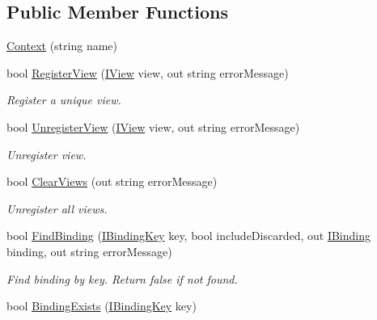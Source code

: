 \subsection*{Public Member Functions}
\begin{DoxyCompactItemize}
\item 
\mbox{\hyperlink{classcp_games_1_1core_1_1_rapid_m_v_c_1_1impl_1_1_context_a5f870e38ed7efdf3fe02ebe0f6052fa2}{Context}} (string name)
\item 
bool \mbox{\hyperlink{classcp_games_1_1core_1_1_rapid_m_v_c_1_1impl_1_1_context_aaca630e99979716757f6b028b8b4aa0c}{Register\+View}} (\mbox{\hyperlink{interfacecp_games_1_1core_1_1_rapid_m_v_c_1_1_i_view}{I\+View}} view, out string error\+Message)
\begin{DoxyCompactList}\small\item\em Register a unique view. \end{DoxyCompactList}\item 
bool \mbox{\hyperlink{classcp_games_1_1core_1_1_rapid_m_v_c_1_1impl_1_1_context_aa1b62f966c4cf9b70e12e4db3bd80903}{Unregister\+View}} (\mbox{\hyperlink{interfacecp_games_1_1core_1_1_rapid_m_v_c_1_1_i_view}{I\+View}} view, out string error\+Message)
\begin{DoxyCompactList}\small\item\em Unregister view. \end{DoxyCompactList}\item 
bool \mbox{\hyperlink{classcp_games_1_1core_1_1_rapid_m_v_c_1_1impl_1_1_context_aa35849819d74cafb71b0056f370872e2}{Clear\+Views}} (out string error\+Message)
\begin{DoxyCompactList}\small\item\em Unregister all views. \end{DoxyCompactList}\item 
bool \mbox{\hyperlink{classcp_games_1_1core_1_1_rapid_m_v_c_1_1impl_1_1_context_a02ac3cc53b35b72269bf8c89d26b93ae}{Find\+Binding}} (\mbox{\hyperlink{interfacecp_games_1_1core_1_1_rapid_m_v_c_1_1_i_binding_key}{I\+Binding\+Key}} key, bool include\+Discarded, out \mbox{\hyperlink{interfacecp_games_1_1core_1_1_rapid_m_v_c_1_1_i_binding}{I\+Binding}} binding, out string error\+Message)
\begin{DoxyCompactList}\small\item\em Find binding by key. Return false if not found. \end{DoxyCompactList}\item 
bool \mbox{\hyperlink{classcp_games_1_1core_1_1_rapid_m_v_c_1_1impl_1_1_context_a57ed228fbab80263bf2197dd27eadbbd}{Binding\+Exists}} (\mbox{\hyperlink{interfacecp_games_1_1core_1_1_rapid_m_v_c_1_1_i_binding_key}{I\+Binding\+Key}} key)

\end{DoxyCompactItemize}
